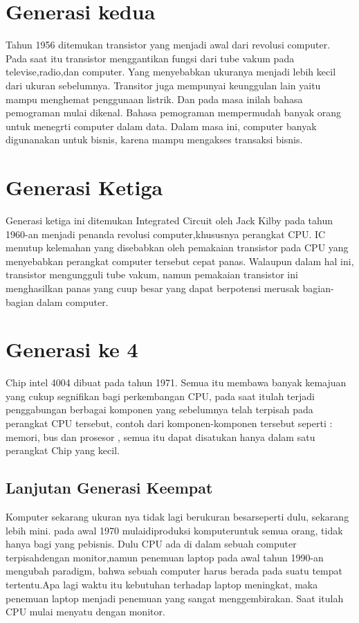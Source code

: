 	\section{Generasi kedua}
 Tahun 1956 ditemukan transistor yang menjadi awal dari revolusi computer. Pada saat itu transistor menggantikan fungsi dari tube vakum pada televise,radio,dan computer. Yang menyebabkan ukuranya menjadi lebih kecil dari ukuran sebelumnya. Transitor juga mempunyai keunggulan lain yaitu mampu menghemat penggunaan listrik.
 Dan pada masa inilah bahasa pemograman mulai dikenal. Bahasa pemograman mempermudah banyak orang untuk menegrti computer dalam data. Dalam masa ini, computer banyak digunanakan untuk bisnis, karena mampu mengakses transaksi bisnis.

 	\section{Generasi Ketiga}
 Generasi ketiga ini ditemukan Integrated Circuit oleh Jack Kilby pada tahun 1960-an menjadi penanda revolusi computer,khususnya perangkat CPU. IC menutup kelemahan yang disebabkan oleh pemakaian transistor pada CPU yang menyebabkan perangkat computer tersebut cepat panas.
 Walaupun dalam hal ini, transistor mengungguli tube vakum, namun pemakaian transistor ini menghasilkan panas yang cuup besar yang dapat berpotensi merusak bagian-bagian dalam computer.

 	\section{Generasi ke 4}
 Chip intel 4004 dibuat pada tahun 1971. Semua itu membawa banyak kemajuan yang cukup segnifikan bagi perkembangan CPU, pada saat itulah terjadi  penggabungan  berbagai komponen yang sebelumnya telah terpisah pada perangkat CPU tersebut, contoh dari komponen-komponen tersebut seperti : memori, bus dan prosesor , semua itu dapat disatukan hanya dalam satu perangkat Chip yang kecil.
	\subsection{Lanjutan Generasi Keempat}
 Komputer sekarang ukuran nya tidak lagi berukuran besarseperti dulu, sekarang lebih mini. pada awal 1970 mulaidiproduksi komputeruntuk semua orang, tidak hanya bagi yang pebisnis.
 Dulu CPU ada di dalam sebuah computer terpisahdengan monitor,namun penemuan laptop pada awal tahun 1990-an mengubah paradigm, bahwa sebuah computer harus berada pada suatu tempat tertentu.Apa lagi waktu itu kebutuhan terhadap laptop meningkat, maka penemuan laptop menjadi penemuan yang sangat menggembirakan. Saat itulah CPU mulai menyatu dengan monitor.


